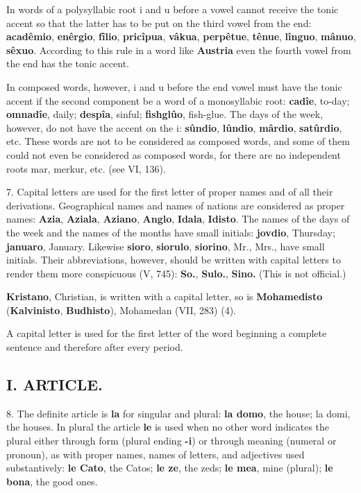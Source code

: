 In words of a polysyllabic root i and u before a vowel cannot receive the tonic accent so that the latter has to be put on the third vowel from the end: \textbf{acadêmio}, \textbf{enêrgio}, \textbf{fîlio}, \textbf{pricîpua}, \textbf{vâkua}, \textbf{perpêtue}, \textbf{tênue}, \textbf{lînguo}, \textbf{mânuo}, \textbf{sêxuo}. According to this rule in a word like \textbf{Austria} even the fourth vowel from the end has the tonic accent. 

In composed words, however, i and u before the end vowel must have the tonic accent if the second component be a word of a monosyllabic root: \textbf{cadîe}, to-day; \textbf{omnadîe}, daily; \textbf{despîa}, sinful; \textbf{fishglûo}, fish-glue. The days of the week, however, do not have the accent on the i: \textbf{sûndio}, \textbf{lûndio}, \textbf{mârdio}, \textbf{satûrdio}, etc. These words are not to be considered as composed words, and some of them could not even be considered as composed words, for there are no independent roots mar, merkur, etc. (see VI, 136). 
    
7. Capital letters are used for the first letter of proper names and of all their derivations. Geographical names and names of nations are considered as proper names: \textbf{Azia}, \textbf{Aziala}, \textbf{Aziano}, \textbf{Anglo}, \textbf{Idala}, \textbf{Idisto}. The names of the days of the week and the names of the months have small initials: \textbf{jovdio}, Thursday; \textbf{januaro}, January. Likewise \textbf{sioro}, \textbf{siorulo}, \textbf{siorino}, Mr., Mrs., have small initials. Their abbreviations, however, should be written with capital letters to render them more conspicuous (V, 745): \textbf{So.}, \textbf{Sulo.}, \textbf{Sino.} (This is not official.) 

\textbf{Kristano}, Christian, is written with a capital letter, so is \textbf{Mohamedisto} (\textbf{Kalvinisto}, \textbf{Budhisto}), Mohamedan (VII, 283) (4).

A capital letter is used for the first letter of the word beginning a complete sentence and therefore after every period.

\subsection*{I. ARTICLE.}
8. The definite article is \textbf{la} for singular and plural: \textbf{la domo}, the house; la domi, the houses. In plural the article \textbf{le} is used when no other word indicates the plural either through form (plural ending \textbf{-i}) or through meaning (numeral or pronoun), as with proper names, names of letters, and adjectives used substantively: \textbf{le Cato}, the Catos; \textbf{le ze}, the zeds; \textbf{le mea}, mine (plural); \textbf{le bona}, the good ones.

